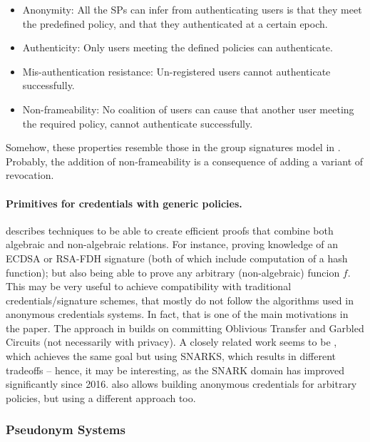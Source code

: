 \begin{itemize}
\item Anonymity: All the SPs can infer from authenticating users is that they
  meet the predefined policy, and that they authenticated at a certain epoch.
\item Authenticity: Only users meeting the defined policies can authenticate.
\item Mis-authentication resistance: Un-registered users cannot authenticate
  successfully.
\item Non-frameability: No coalition of users can cause that another user
  meeting the required policy, cannot authenticate successfully.
\end{itemize}

Somehow, these properties resemble those in the group signatures model in
\cite{kty04}. Probably, the addition of non-frameability is a consequence
of adding a variant of revocation.

\paragraph{Primitives for credentials with generic policies.} \cite{cgm16}
describes techniques to be able to create efficient proofs that combine both
algebraic and non-algebraic relations. For instance, proving knowledge of an
ECDSA or RSA-FDH signature (both of which include computation of a hash
function); but also being able to prove any arbitrary (non-algebraic) funcion
$f$. This may be very useful to achieve compatibility with traditional
credentials/signature schemes, that mostly do not follow the algorithms
used in anonymous credentials systems. In fact, that is one of the main
motivations in the paper. The approach in \cite{cgm16} builds on committing
Oblivious Transfer and Garbled Circuits (not necessarily with privacy).
A closely related work seems to be \cite{dfkp16},
which achieves the same goal but using SNARKS, which results in different
tradeoffs -- hence, it may be interesting, as the SNARK domain has improved
significantly since 2016. \cite{kkl+16} also allows building anonymous
credentials for arbitrary policies, but using a different approach too.

\subsubsection{Pseudonym Systems}
\label{sssec:pseudonyms}


